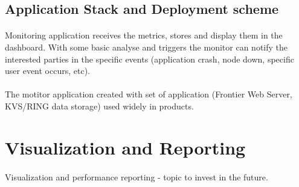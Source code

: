 \subsection*{Application Stack and Deployment scheme}
\paragraph{}
Monitoring application receives the metrics, stores and display them in the dashboard.
With some basic analyse and triggers the monitor can notify the interested parties in the specific events
(application crash, node down, specific user event occurs, etc).

\paragraph{}
The motitor application created with set of application (Frontier Web Server, KVS/RING data storage) used widely in products.

\paragraph{}

\section*{Visualization and Reporting}
\paragraph{}
Visualization and performance reporting - topic to invest in the future.


